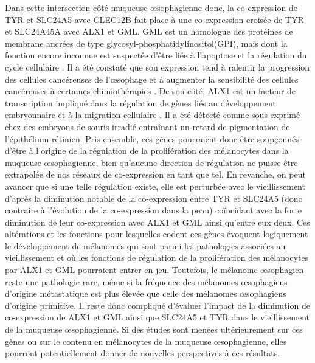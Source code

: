 Dans cette intersection côté muqueuse œsophagienne donc, la co-expression de TYR et SLC24A5 avec CLEC12B fait place à une co-expression croisée de TYR et SLC24A45A avec ALX1 et GML. 
GML est un homologue des protéines de membrane ancrées de type glycosyl-phosphatidylinositol(GPI), mais dont la fonction encore inconnue est suspectée d'être liée à l'apoptose et la régulation du cycle cellulaire . Il a été constaté que son expression tend à ralentir la progression des cellules cancéreuses de l'œsophage et à augmenter la sensibilité des cellules cancéreuses à certaines chimiothérapies . 
De son côté, ALX1 est un facteur de transcription impliqué dans la régulation de gènes liés au développement embryonnaire et à la migration cellulaire . Il a été détecté comme sous exprimé chez des embryons de souris irradié entraînant un retard de pigmentation de l'épithélium rétinien. 
Pris ensemble, ces gènes pourraient donc être soupçonnés d'être à l'origine de la régulation de la prolifération des mélanocytes dans la muqueuse œsophagienne, bien qu'aucune direction de régulation ne puisse être extrapolée de nos réseaux de co-expression en tant que tel. En revanche, on peut avancer que si une telle régulation existe, elle est perturbée avec le vieillissement d'après la diminution notable de la co-expression entre TYR et SLC24A5 (donc contraire à l'évolution de la co-expression dans la peau) coïncidant avec la forte diminution de leur co-expression avec ALX1 et GML ainsi qu'entre eux deux. 
Ces altérations et les fonctions pour lesquelles codent ces gènes évoquent logiquement le développement de mélanomes qui sont parmi les pathologies associées au vieillissement et où les fonctions de régulation de la prolifération des mélanocytes par ALX1 et GML pourraient entrer en jeu. Toutefois, le mélanome œsophagien reste une pathologie rare, même si la fréquence des mélanomes œsophagiens d'origine métastatique est plus élevée que celle des mélanomes œsophagiens d'origine primitive. Il reste donc compliqué d'évaluer l'impact de la diminution de co-expression de ALX1 et GML ainsi que SLC24A5 et TYR dans le vieillissement de la muqueuse œsophagienne. Si des études sont menées ultérieurement sur ces gènes ou sur le contenu en mélanocytes de la muqueuse œsophagienne, elles pourront potentiellement donner de nouvelles perspectives à ces résultats.

